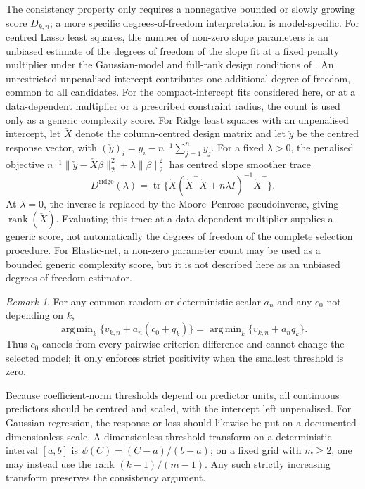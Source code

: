 \documentclass[12pt]{article}
\DeclareMathOperator*{\argmin}{arg\,min}
\newenvironment{bluechange}{\begingroup\color[rgb]{0.00,0.00,1.00}}{\endgroup}
\theoremstyle{remark}
\newtheorem{remark}{Remark}
\theoremstyle{plain}
\begin{document}
\begin{bluechange}
The consistency property only requires a nonnegative bounded or slowly growing score $D_{k,n}$; a more specific degrees-of-freedom interpretation is model-specific. For centred Lasso least squares, the number of non-zero slope parameters is an unbiased estimate of the degrees of freedom of the slope fit at a fixed penalty multiplier under the Gaussian-model and full-rank design conditions of \citet{zou_degrees_2007}. An unrestricted unpenalised intercept contributes one additional degree of freedom, common to all candidates. For the compact-intercept fits considered here, or at a data-dependent multiplier or a prescribed constraint radius, the count is used only as a generic complexity score. For Ridge least squares with an unpenalised intercept, let $\check X$ denote the column-centred design matrix and let $\check y$ be the centred response vector, with $(\check y)_i=y_i-n^{-1}\sum_{j=1}^n y_j$. For a fixed $\lambda>0$, the penalised objective $n^{-1}\|\check y-\check X\beta\|_2^2+\lambda\|\beta\|_2^2$ has centred slope smoother trace
\begin{equation}\label{Eqs: Ridge df}
D^{\mathrm{ridge}}(\lambda)
=\operatorname{tr}\{\check X(\check X^\top \check X+n\lambda I)^{-1}\check X^\top\}.
\end{equation}
At $\lambda=0$, the inverse is replaced by the Moore--Penrose pseudoinverse, giving $\operatorname{rank}(\check X)$. Evaluating this trace at a data-dependent multiplier supplies a generic score, not automatically the degrees of freedom of the complete selection procedure.
For Elastic-net, a non-zero parameter count may be used as a bounded generic complexity score, but it is not described here as an unbiased degrees-of-freedom estimator.

\begin{remark}
For any common random or deterministic scalar $a_n$ and any $c_0$ not depending on $k$,
\[
\argmin_k\{v_{k,n}+a_n(c_0+q_k)\}
=\argmin_k\{v_{k,n}+a_nq_k\}.
\]
Thus $c_0$ cancels from every pairwise criterion difference and cannot change the selected model; it only enforces strict positivity when the smallest threshold is zero.
\end{remark}

Because coefficient-norm thresholds depend on predictor units, all continuous predictors should be centred and scaled, with the intercept left unpenalised. For Gaussian regression, the response or loss should likewise be put on a documented dimensionless scale. A dimensionless threshold transform on a deterministic interval $[a,b]$ is $\psi(C)=(C-a)/(b-a)$; on a fixed grid with $m\geq2$, one may instead use the rank $(k-1)/(m-1)$. Any such strictly increasing transform preserves the consistency argument.
\end{bluechange}
\end{document}

